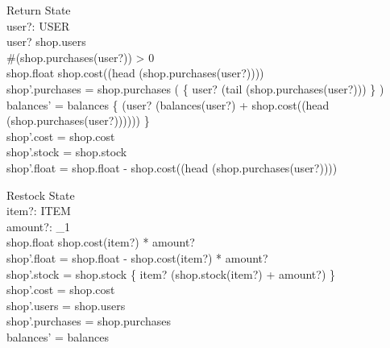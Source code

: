\documentclass[a4paper]{article}
\begin{document}
\begin{schema}{Return}
	\Delta State \\
	user?: USER \\
	\where
	user? \in shop.users \\
	\#(shop.purchases(user?)) > 0 \\
	shop.float \geq shop.cost((head (shop.purchases(user?)))) \\
	shop'.purchases = shop.purchases \oplus ( \{ user? \mapsto (tail (shop.purchases(user?))) \} ) \\
	balances' = balances \oplus \{ (user? \mapsto (balances(user?) + shop.cost((head (shop.purchases(user?)))))) \} \\
	shop'.cost = shop.cost \\
	shop'.stock = shop.stock \\
	shop'.float = shop.float - shop.cost((head (shop.purchases(user?)))) \\
\end{schema}

\begin{schema}{Restock}
	\Delta State \\
	item?: ITEM \\
	amount?: \nat_1 \\
	\where
	shop.float \geq shop.cost(item?) * amount? \\
	shop'.float = shop.float - shop.cost(item?) * amount? \\
	shop'.stock = shop.stock \oplus \{ item? \mapsto (shop.stock(item?) + amount?) \} \\
	shop'.cost = shop.cost \\
	shop'.users = shop.users \\
	shop'.purchases = shop.purchases \\
	balances' = balances \\
\end{schema}
\end{document}
